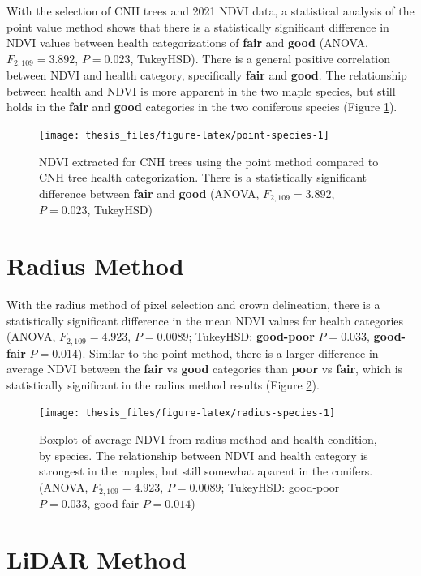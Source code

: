 \documentclass[12pt,twoside]{reedthesis}
\begin{document}
With the selection of CNH trees and 2021 NDVI data, a statistical analysis of the point value method shows that there is a statistically significant difference in NDVI values between health categorizations of \textbf{fair} and \textbf{good} (ANOVA, \(F_{2, 109} = 3.892\), \(P = 0.023\), TukeyHSD). There is a general positive correlation between NDVI and health category, specifically \textbf{fair} and \textbf{good}. The relationship between health and NDVI is more apparent in the two maple species, but still holds in the \textbf{fair} and \textbf{good} categories in the two coniferous species (Figure \ref{fig:point-species}).


\begin{figure}

{\centering \texttt{[image: thesis\_files/figure-latex/point-species-1]} 

}

\caption[Point Method NDVI and Health Rating, by Species]{NDVI extracted for CNH trees using the point method compared to CNH tree health categorization. There is a statistically significant difference between \textbf{fair} and \textbf{good} (ANOVA, \(F_{2, 109} = 3.892\), \(P = 0.023\), TukeyHSD)}\label{fig:point-species}
\end{figure}
\hypertarget{radius-method-1}{%
\section{Radius Method}\label{radius-method-1}}

With the radius method of pixel selection and crown delineation, there is a statistically significant difference in the mean NDVI values for health categories (ANOVA, \(F_{2,109}=4.923\), \(P = 0.0089\); TukeyHSD: \textbf{good-poor} \(P = 0.033\), \textbf{good-fair} \(P = 0.014\)). Similar to the point method, there is a larger difference in average NDVI between the \textbf{fair} vs \textbf{good} categories than \textbf{poor} vs \textbf{fair}, which is statistically significant in the radius method results (Figure \ref{fig:radius-species}).
\begin{figure}

{\centering \texttt{[image: thesis\_files/figure-latex/radius-species-1]} 

}

\caption[Radius method mean NDVI and health condition by species]{Boxplot of average NDVI from radius method and health condition, by species. The relationship between NDVI and health category is strongest in the maples, but still somewhat aparent in the conifers. (ANOVA, $F_{2,109}=4.923$, $P = 0.0089$; TukeyHSD: good-poor $P = 0.033$, good-fair $P = 0.014$)}\label{fig:radius-species}
\end{figure}
\hypertarget{lidar-method-1}{%
\section{LiDAR Method}\label{lidar-method-1}}
\end{document}
